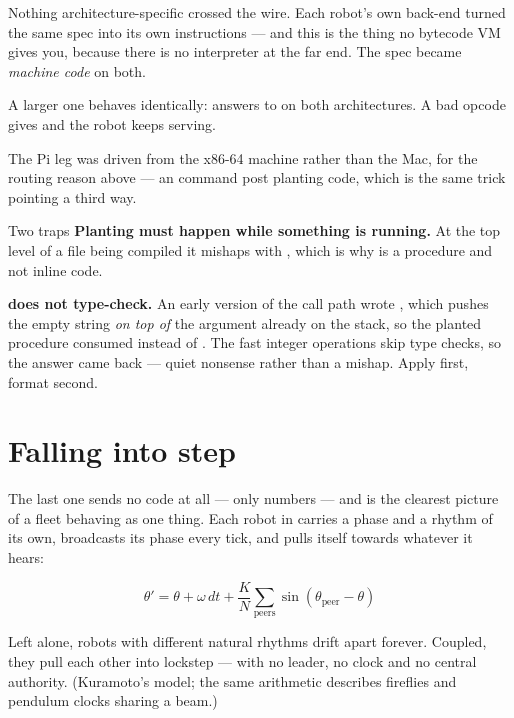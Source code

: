Nothing architecture-specific crossed the wire. Each robot's own back-end
turned the same spec into its own instructions --- and this is the thing no
bytecode VM gives you, because there is no interpreter at the far end. The
spec became \emph{machine code} on both.

A larger one behaves identically:  answers  to  on both
architectures. A bad opcode gives  and the robot keeps
serving.

The Pi leg was driven from the x86-64 machine rather than the Mac, for the
routing reason above --- an  command post planting
 code, which is the same trick pointing a third way.

\begin{callout}{Two traps}
\textbf{Planting must happen while something is running.} At the top level
of a file being compiled it mishaps with , which is why  is a procedure and not inline code.

\textbf{ does not type-check.} An early version of the call path
wrote , which pushes the empty string
\emph{on top of} the argument already on the stack, so the planted procedure
consumed  instead of . The fast integer operations skip
type checks, so the answer came back  --- quiet nonsense rather
than a mishap. Apply first, format second.
\end{callout}

\section{Falling into step}

The last one sends no code at all --- only numbers --- and is the clearest
picture of a fleet behaving as one thing. Each robot in 
carries a phase and a rhythm of its own, broadcasts its phase every tick, and
pulls itself towards whatever it hears:

\[ \theta' = \theta + \omega\,dt + \frac{K}{N}\sum_{\text{peers}} \sin(\theta_{\text{peer}} - \theta) \]

Left alone, robots with different natural rhythms drift apart forever.
Coupled, they pull each other into lockstep --- with no leader, no clock and
no central authority. (Kuramoto's model; the same arithmetic describes
fireflies and pendulum clocks sharing a beam.)

